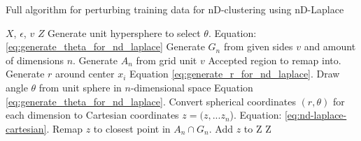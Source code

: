 \begin{algorithm}[H]
   \caption{Full algorithm for perturbing training data for nD-clustering using nD-Laplace}
   \begin{algorithmic}
      \Require $X$,  $\epsilon$, $v$ 
      \Ensure $Z$ 
      \State Generate unit hypersphere to select $\theta$. \Comment Equation: \ref{eq:generate_theta_for_nd_laplace}
      \State Generate $G_n$ from given sides $v$ and amount of dimensions $n$.
        \State Generate $A_n$ from grid unit $v$ \Comment Accepted region to remap into. 
      \State Generate $r$ around center $x_i$ \Comment Equation \ref{eq:generate_r_for_nd_laplace}.
      \State Draw angle $\theta$ from unit sphere in $n$-dimensional space \Comment Equation \ref{eq:generate_theta_for_nd_laplace}.
      \State Convert spherical coordinates $(r, \theta)$ for \\ each dimension to Cartesian coordinates $z = (z, ...z_n$). \Comment Equation: \ref{eq:nd-laplace-cartesian}.
            \State Remap $z$ to closest point in $A_n \cap G_n$.
       \EndIf
      \State Add $z$ to Z
      \EndFor
      \State \Return Z
   \end{algorithmic}
   \label{alg:nd-laplace}
\end{algorithm}